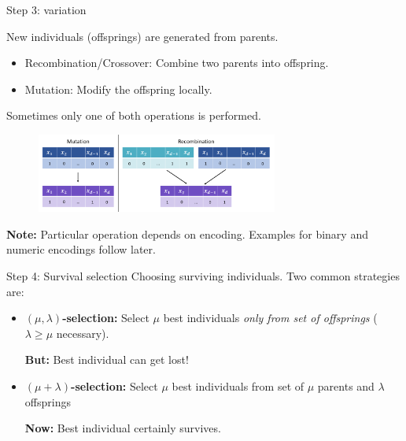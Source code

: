 \documentclass[11pt,compress,t,notes=noshow, xcolor=table]{beamer}
\begin{document}
\begin{vbframe}{Step 3: variation}

New individuals (offsprings) are generated from parents.

\begin{itemize}
\item Recombination/Crossover: Combine two parents into offspring.
\item Mutation: Modify the offspring locally.
\end{itemize}

Sometimes only one of both operations is performed.

\vspace{0.3cm}
\begin{center}
\begin{figure}
  \includegraphics[width = 8cm, height = 2.6cm ]{figure_man/rec-and-mut.png}\\
\end{figure}
\end{center}

\textbf{Note: } Particular operation depends on encoding.
Examples for binary and numeric encodings follow later.

\end{vbframe}

\begin{vbframe}{Step 4: Survival selection}
Choosing surviving individuals.
Two common strategies are:

\vspace{1em}

\begin{itemize}
    \setlength{\itemsep}{1em}
    \item \textbf{$(\mu, \lambda)$-selection:}
        Select $\mu$ best individuals \textit{only from set of offsprings} ($\lambda \ge \mu$ necessary).
        
        \textbf{But:} Best individual can get lost!
    \item \textbf{$(\mu + \lambda)$-selection:}
        Select $\mu$ best individuals from set of $\mu$ parents and $\lambda$ offsprings
        
        \textbf{Now:} Best individual certainly survives.
\end{itemize}

\end{vbframe}
\end{document}
